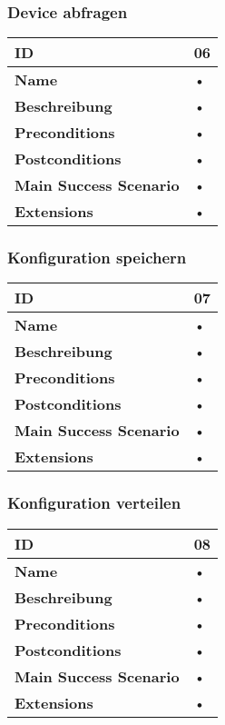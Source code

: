 \subsubsection{Device abfragen}
\mbox{}
\begin{longtable}{| p{4cm} | p{11.7cm} |}
 \hline
 \textbf{ID} & 06\\ \hline 
 \textbf{Name} & • \\ \hline 
 \textbf{Beschreibung} & • \\ \hline 
 \textbf{Preconditions} & • \\ \hline 
 \textbf{Postconditions} & • \\ \hline 
 \textbf{Main Success Scenario} & • \\ \hline 
 \textbf{Extensions} & • \\ \hline 
 \end{longtable}
 
\subsubsection{Konfiguration speichern}
\mbox{}
\begin{longtable}{| p{4cm} | p{11.7cm} |}
 \hline
 \textbf{ID} & 07\\ \hline 
 \textbf{Name} & • \\ \hline 
 \textbf{Beschreibung} & • \\ \hline 
 \textbf{Preconditions} & • \\ \hline 
 \textbf{Postconditions} & • \\ \hline 
 \textbf{Main Success Scenario} & • \\ \hline 
 \textbf{Extensions} & • \\ \hline 
 \end{longtable}
 
\subsubsection{Konfiguration verteilen}
\mbox{}
\begin{longtable}{| p{4cm} | p{11.7cm} |}
 \hline
 \textbf{ID} & 08\\ \hline 
 \textbf{Name} & • \\ \hline 
 \textbf{Beschreibung} & • \\ \hline 
 \textbf{Preconditions} & • \\ \hline 
 \textbf{Postconditions} & • \\ \hline 
 \textbf{Main Success Scenario} & • \\ \hline 
 \textbf{Extensions} & • \\ \hline 
 \end{longtable}
 
